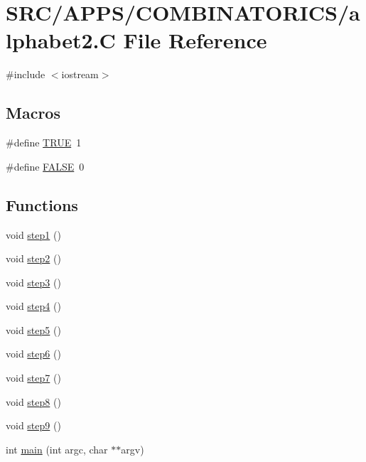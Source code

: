 \hypertarget{alphabet2_8_c}{}\section{S\+R\+C/\+A\+P\+P\+S/\+C\+O\+M\+B\+I\+N\+A\+T\+O\+R\+I\+C\+S/alphabet2.C File Reference}
\label{alphabet2_8_c}
{\ttfamily \#include $<$iostream$>$}\newline
\subsection*{Macros}
\begin{DoxyCompactItemize}
\item 
\#define \mbox{\hyperlink{alphabet2_8_c_aa8cecfc5c5c054d2875c03e77b7be15d}{T\+R\+UE}}~1
\item 
\#define \mbox{\hyperlink{alphabet2_8_c_aa93f0eb578d23995850d61f7d61c55c1}{F\+A\+L\+SE}}~0
\end{DoxyCompactItemize}
\subsection*{Functions}
\begin{DoxyCompactItemize}
\item 
void \mbox{\hyperlink{alphabet2_8_c_a3a49c788d5af77e40bd11fa8a58e3aad}{step1}} ()
\item 
void \mbox{\hyperlink{alphabet2_8_c_af8e85ed40687e598dd13d12f16f9f91f}{step2}} ()
\item 
void \mbox{\hyperlink{alphabet2_8_c_a398da9deea29d9ee8737f7ac2c69c1ff}{step3}} ()
\item 
void \mbox{\hyperlink{alphabet2_8_c_a0d2923306f849e222a939be42d0766f4}{step4}} ()
\item 
void \mbox{\hyperlink{alphabet2_8_c_a7cd71333196d90783e0de62c4fa49aa6}{step5}} ()
\item 
void \mbox{\hyperlink{alphabet2_8_c_a818d2a75aa35872731fc29c2bdc28a15}{step6}} ()
\item 
void \mbox{\hyperlink{alphabet2_8_c_ab8e6c007fd00864128c789dcbb7431d6}{step7}} ()
\item 
void \mbox{\hyperlink{alphabet2_8_c_ac956094a7e2e4c7381a221557cb3c820}{step8}} ()
\item 
void \mbox{\hyperlink{alphabet2_8_c_a23e5e69193b86fbfe05b8fad607861d8}{step9}} ()
\item 
int \mbox{\hyperlink{alphabet2_8_c_a3c04138a5bfe5d72780bb7e82a18e627}{main}} (int argc, char $\ast$$\ast$argv)
\end{DoxyCompactItemize}
